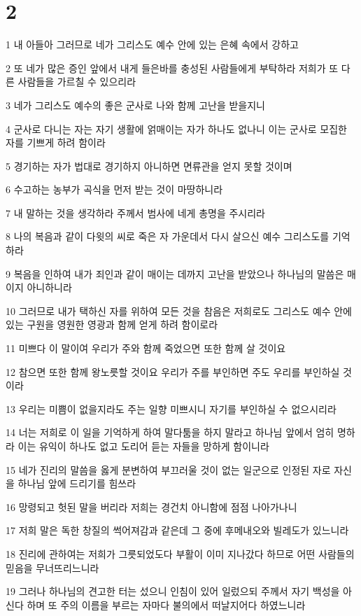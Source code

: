 \chapter{2}

\par 1 내 아들아 그러므로 네가 그리스도 예수 안에 있는 은혜 속에서 강하고
\par 2 또 네가 많은 증인 앞에서 내게 들은바를 충성된 사람들에게 부탁하라 저희가 또 다른 사람들을 가르칠 수 있으리라
\par 3 네가 그리스도 예수의 좋은 군사로 나와 함께 고난을 받을지니
\par 4 군사로 다니는 자는 자기 생활에 얽매이는 자가 하나도 없나니 이는 군사로 모집한 자를 기쁘게 하려 함이라
\par 5 경기하는 자가 법대로 경기하지 아니하면 면류관을 얻지 못할 것이며
\par 6 수고하는 농부가 곡식을 먼저 받는 것이 마땅하니라
\par 7 내 말하는 것을 생각하라 주께서 범사에 네게 총명을 주시리라
\par 8 나의 복음과 같이 다윗의 씨로 죽은 자 가운데서 다시 살으신 예수 그리스도를 기억하라
\par 9 복음을 인하여 내가 죄인과 같이 매이는 데까지 고난을 받았으나 하나님의 말씀은 매이지 아니하니라
\par 10 그러므로 내가 택하신 자를 위하여 모든 것을 참음은 저희로도 그리스도 예수 안에 있는 구원을 영원한 영광과 함께 얻게 하려 함이로라
\par 11 미쁘다 이 말이여 우리가 주와 함께 죽었으면 또한 함께 살 것이요
\par 12 참으면 또한 함께 왕노릇할 것이요 우리가 주를 부인하면 주도 우리를 부인하실 것이라
\par 13 우리는 미쁨이 없을지라도 주는 일향 미쁘시니 자기를 부인하실 수 없으시리라
\par 14 너는 저희로 이 일을 기억하게 하여 말다툼을 하지 말라고 하나님 앞에서 엄히 명하라 이는 유익이 하나도 없고 도리어 듣는 자들을 망하게 함이니라
\par 15 네가 진리의 말씀을 옳게 분변하여 부끄러울 것이 없는 일군으로 인정된 자로 자신을 하나님 앞에 드리기를 힘쓰라
\par 16 망령되고 헛된 말을 버리라 저희는 경건치 아니함에 점점 나아가나니
\par 17 저희 말은 독한 창질의 썩어져감과 같은데 그 중에 후메내오와 빌레도가 있느니라
\par 18 진리에 관하여는 저희가 그릇되었도다 부활이 이미 지나갔다 하므로 어떤 사람들의 믿음을 무너뜨리느니라
\par 19 그러나 하나님의 견고한 터는 섰으니 인침이 있어 일렀으되 주께서 자기 백성을 아신다 하며 또 주의 이름을 부르는 자마다 불의에서 떠날지어다 하였느니라
